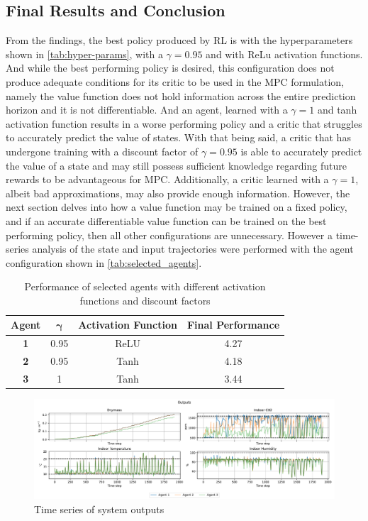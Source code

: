 \subsection{Final Results and Conclusion}
\label{section:rl-deterministic-results}
From the findings, the best policy produced by RL is with the hyperparameters shown in \autoref{tab:hyper-params}, with a $\gamma = 0.95$ and with ReLu activation functions. And while the best performing policy is desired, this configuration does not produce adequate conditions for its critic to be used in the MPC formulation, namely the value function does not hold information across the entire prediction horizon and it is not differentiable. And an agent, learned with a $\gamma = 1$ and tanh activation function results in a worse performing policy and a critic that struggles to accurately predict the value of states. With that being said, a critic that has undergone training with a discount factor of $\gamma = 0.95$ is able to accurately predict the value of a state and may still possess sufficient knowledge regarding future rewards to be advantageous for MPC. Additionally, a critic learned with a $\gamma = 1$, albeit bad approximations, may also provide enough information.
However, the next section delves into how a value function may be trained on a fixed policy, and if an accurate differentiable value function can be trained on the best performing policy, then all other configurations are unnecessary. However a time-series analysis of the state and input trajectories were performed with the agent configuration shown in \autoref{tab:selected_agents}. 

\begin{table}[h!]
	\centering
	\begin{tabular}{c c c c}
		\toprule
		\textbf{Agent} & $\boldsymbol{\gamma}$ & \textbf{Activation Function} & \textbf{Final Performance} \\
		\midrule
		\textbf{ 1} & 0.95 & ReLU & 4.27 \\
		\textbf{ 2} & 0.95 & Tanh & 4.18 \\
		\textbf{ 3} & 1 & Tanh & 3.44 \\
		\bottomrule
	\end{tabular}
	\caption{Performance of selected agents with different activation functions and discount factors}
	\label{tab:selected_agents}
\end{table}

\begin{figure}[H]
    \centering
    \includegraphics[width = \textwidth]{figures/selected_policies_outputs.pdf}
    \caption{Time series of system outputs}
    \label{fig:selected-policies-outputs}
\end{figure}

